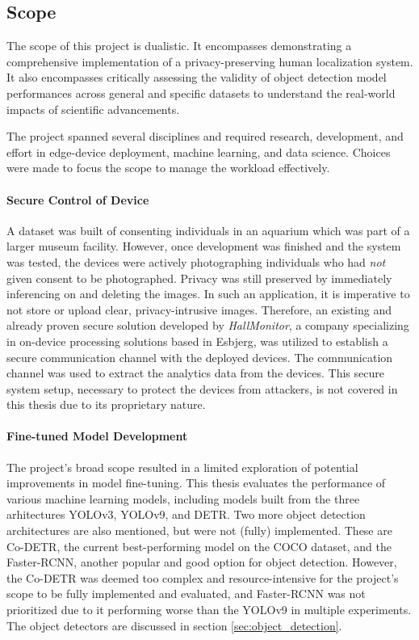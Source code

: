 \newpage
\subsection{Scope}
The scope of this project is dualistic. It encompasses demonstrating a comprehensive implementation of a privacy-preserving human localization system. It also encompasses critically assessing the validity of object detection model performances across general and specific datasets to understand the real-world impacts of scientific advancements.

The project spanned several disciplines and required research, development, and effort in edge-device deployment, machine learning, and data science. Choices were made to focus the scope to manage the workload effectively.

\paragraph{Secure Control of Device}
\label{sec:scope_ssh}
A dataset was built of consenting individuals in an aquarium which was part of a larger museum facility. However, once development was finished and the system was tested, the devices were actively photographing individuals who had \textit{not} given consent to be photographed. Privacy was still preserved by immediately inferencing on and deleting the images. In such an application, it is imperative to not store or upload clear, privacy-intrusive images. Therefore, an existing and already proven secure solution developed by \textit{HallMonitor}, a company specializing in on-device processing solutions based in Esbjerg, was utilized to establish a secure communication channel with the deployed devices. The communication channel was used to extract the analytics data from the devices. This secure system setup, necessary to protect the devices from attackers, is not covered in this thesis due to its proprietary nature. 

\paragraph{Fine-tuned Model Development}
The project's broad scope resulted in a limited exploration of potential improvements in model fine-tuning. This thesis evaluates the performance of various machine learning models, including models built from the three arhitectures YOLOv3, YOLOv9, and DETR. Two more object detection architectures are also mentioned, but were not (fully) implemented. These are Co-DETR, the current best-performing model on the COCO dataset, and the Faster-RCNN, another popular and good option for object detection. However, the Co-DETR was deemed too complex and resource-intensive for the project's scope to be fully implemented and evaluated, and Faster-RCNN was not prioritized due to it performing worse than the YOLOv9 in multiple experiments. The object detectors are discussed in section \ref{sec:object_detection}.

